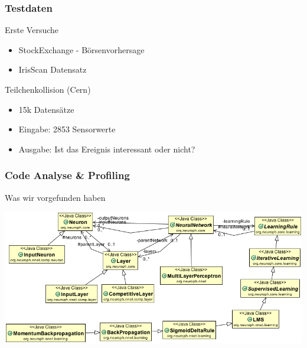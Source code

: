 \documentclass[18pt]{beamer}
\begin{document}
	\begin{frame}[c]\frametitle{Testdaten}
		\begin{block}{Erste Versuche}
		    \begin{itemize}
		    	\item StockExchange - Börsenvorhersage
		    	\item IrisScan Datensatz
		    \end{itemize}
		\end{block}
		\begin{block}{Teilchenkollision (Cern)}
		    \begin{itemize}
		    	\item 15k Datensätze
		    	\item Eingabe: 2853 Sensorwerte
				\item Ausgabe: Ist das Ereignis interessant oder nicht? 
		    \end{itemize}
		\end{block}		
	\end{frame}

	\begin{frame}[c]\frametitle{Code Analyse \& Profiling}
		\begin{block}{Was wir vorgefunden haben}
			\begin{center}
				\includegraphics[scale=0.4]{images/Klassendiagramm.png}
			\end{center}
		\end{block}
	\end{frame}
	
\end{document}
